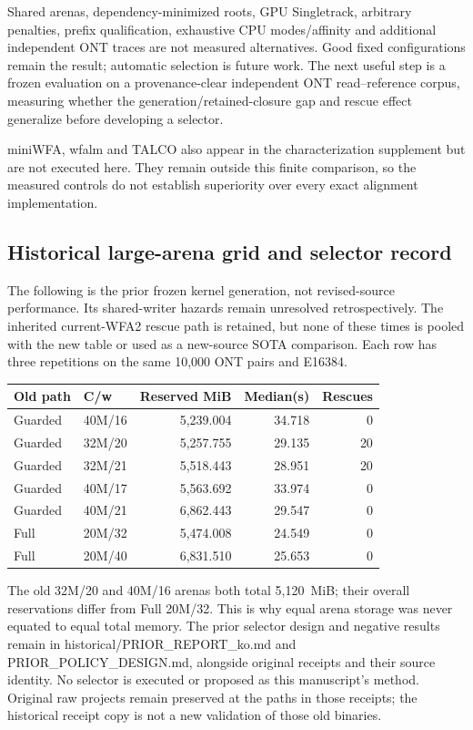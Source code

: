 \documentclass[11pt,a4paper]{article}
\begin{document}
Shared arenas, dependency-minimized roots, GPU Singletrack, arbitrary penalties, prefix qualification, exhaustive CPU modes/affinity and additional independent ONT traces are not measured alternatives. Good fixed configurations remain the result; automatic selection is future work. The next useful step is a frozen evaluation on a provenance-clear independent ONT read--reference corpus, measuring whether the generation/retained-closure gap and rescue effect generalize before developing a selector.

miniWFA, wfalm and TALCO also appear in the characterization supplement but are not executed here. They remain outside this finite comparison, so the measured controls do not establish superiority over every exact alignment implementation.

\subsection{Historical large-arena grid and selector record}
The following is the prior frozen kernel generation, not revised-source performance. Its shared-writer hazards remain unresolved retrospectively. The inherited current-WFA2 rescue path is retained, but none of these times is pooled with the new table or used as a new-source SOTA comparison. Each row has three repetitions on the same 10,000 ONT pairs and E16384.
\begin{center}\small\begin{tabular}{llrrr}\toprule
Old path & C/w & Reserved MiB & Median(s) & Rescues\\\midrule
Guarded & 40M/16 & 5,239.004 & 34.718 & 0\\
Guarded & 32M/20 & 5,257.755 & 29.135 & 20\\
Guarded & 32M/21 & 5,518.443 & 28.951 & 20\\
Guarded & 40M/17 & 5,563.692 & 33.974 & 0\\
Guarded & 40M/21 & 6,862.443 & 29.547 & 0\\
Full & 20M/32 & 5,474.008 & 24.549 & 0\\
Full & 20M/40 & 6,831.510 & 25.653 & 0\\
\bottomrule\end{tabular}\end{center}

The old 32M/20 and 40M/16 arenas both total 5,120~MiB; their overall reservations differ from Full 20M/32. This is why equal arena storage was never equated to equal total memory. The prior selector design and negative results remain in historical/PRIOR\_REPORT\_ko.md and PRIOR\_POLICY\_DESIGN.md, alongside original receipts and their source identity. No selector is executed or proposed as this manuscript's method. Original raw projects remain preserved at the paths in those receipts; the historical receipt copy is not a new validation of those old binaries.
\end{document}
